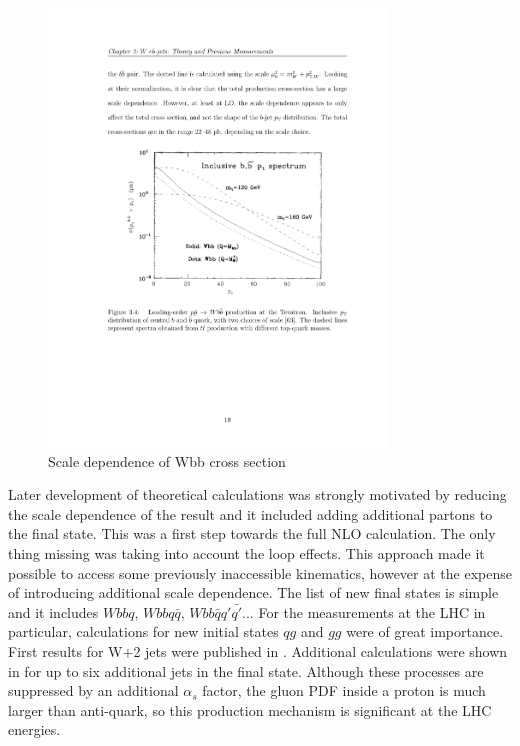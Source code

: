 \begin{figure}[htbp]
	\centering
		\includegraphics[width=0.8\textwidth]{Figures/scale_dep.pdf}
	\caption[Scale dependence of Wbb cross section]{Scale dependence of Wbb cross section}
	\label{fig:scale_dep}
\end{figure}
\par Later development of theoretical calculations was strongly motivated by reducing the scale dependence of the result and it included adding additional partons to the final state. This was a first step towards the full NLO calculation. The only thing missing was taking into account the loop effects. This approach made it possible to access some previously inaccessible kinematics, however at the expense of introducing additional scale dependence. The list of new final states is simple and it includes $Wbbq$, $Wbbq\bar{q}$, $Wbb\bar{q}q'\bar{q'}$... For the measurements at the LHC in particular, calculations for new initial states $qg$ and $gg$ were of great importance. First results for W+2 jets were published in \cite{Ellis:1998fv}. Additional calculations were shown in \cite{Mangano:2001xp} for up to six additional jets in the final state. Although these processes are suppressed by an additional $\alpha_s$ factor, the gluon PDF inside a proton is much larger than anti-quark, so this production mechanism is significant at the LHC energies. 
